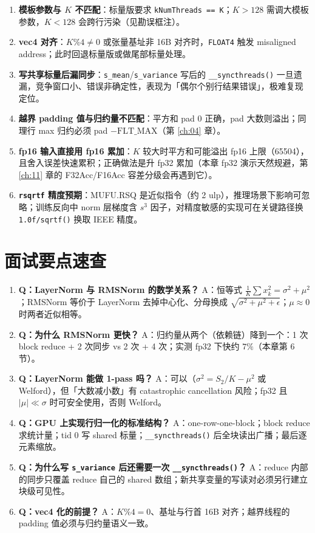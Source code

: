 \begin{enumerate}
  \item \textbf{模板参数与 $K$ 不匹配}：标量版要求 \texttt{kNumThreads == K}；$K > 128$ 需调大模板参数，$K < 128$ 会跨行污染（见勘误框注）。
  \item \textbf{vec4 对齐}：$K \% 4 \neq 0$ 或张量基址非 16B 对齐时，\texttt{FLOAT4} 触发 misaligned address；此时回退标量版或做尾部标量处理。
  \item \textbf{写共享标量后漏同步}：\texttt{s\_mean}/\texttt{s\_variance} 写后的 \texttt{\_\allowbreak{}\_\allowbreak{}syncthreads\allowbreak{}()} 一旦遗漏，竞争窗口小、错误非确定性，表现为「偶尔个别行结果错误」，极难复现定位。
  \item \textbf{越界 padding 值与归约量不匹配}：平方和 pad $0$ 正确，pad 大数则溢出；同理行 max 归约必须 pad $-\mathrm{FLT\_MAX}$（第 \ref{ch:04} 章）。
  \item \textbf{fp16 输入直接用 fp16 累加}：$K$ 较大时平方和可能溢出 fp16 上限（65504），且舍入误差快速累积；正确做法是升 fp32 累加（本章 fp32 演示天然规避，第 \ref{ch:11} 章的 F32Acc/F16Acc 容差分级会再遇到它）。
  \item \textbf{\texttt{rsqrtf} 精度预期}：MUFU.RSQ 是近似指令（约 2 ulp），推理场景下影响可忽略；训练反向中 norm 层梯度含 $s^3$ 因子，对精度敏感的实现可在关键路径换 \texttt{1.0f/\allowbreak{}sqrtf\allowbreak{}()} 换取 IEEE 精度。
\end{enumerate}

\section{面试要点速查}

\begin{enumerate}
  \item \textbf{Q：LayerNorm 与 RMSNorm 的数学关系？} A：恒等式 $\frac{1}{K}\sum x_k^2 = \sigma^2 + \mu^2$；RMSNorm 等价于 LayerNorm 去掉中心化、分母换成 $\sqrt{\sigma^2+\mu^2+\epsilon}$；$\mu \approx 0$ 时两者近似相等。
  \item \textbf{Q：为什么 RMSNorm 更快？} A：归约量从两个（依赖链）降到一个：1 次 block reduce + 2 次同步 vs 2 次 + 4 次；实测 fp32 下快约 $7\%$（本章第 6 节）。
  \item \textbf{Q：LayerNorm 能做 1-pass 吗？} A：可以（$\sigma^2 = S_2/K - \mu^2$ 或 Welford），但「大数减小数」有 catastrophic cancellation 风险；fp32 且 $|\mu| \ll \sigma$ 时可安全使用，否则 Welford。
  \item \textbf{Q：GPU 上实现行归一化的标准结构？} A：one-row-one-block；block reduce 求统计量；tid 0 写 shared 标量；\texttt{\_\allowbreak{}\_\allowbreak{}syncthreads\allowbreak{}()} 后全块读出广播；最后逐元素缩放。
  \item \textbf{Q：为什么写 \texttt{s\_variance} 后还需要一次 \texttt{\_\allowbreak{}\_\allowbreak{}syncthreads\allowbreak{}()}？} A：reduce 内部的同步只覆盖 reduce 自己的 shared 数组；新共享变量的写读对必须另行建立块级可见性。
  \item \textbf{Q：vec4 化的前提？} A：$K \% 4 = 0$、基址与行首 16B 对齐；越界线程的 padding 值必须与归约量语义一致。
\end{enumerate}

